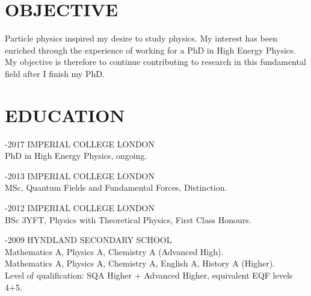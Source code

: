 \documentclass[9pt]{res} %
\begin{document}
 
 
\vspace{0.2cm}
\address{ \\44 Rue de la Combette\\01630 St Genis-Pouilly\\ France\\	matthew.citron09@imperial.ac.uk}
 
                                             
\begin{resume}
                                               
 
\section{OBJECTIVE}
\vspace{0.2cm}
    Particle physics inspired my desire to study physics. My interest has been enriched through the experience of working for a PhD in High Energy Physics. My objective is therefore to continue contributing to research in this fundamental field after I finish my PhD.
   
\section{EDUCATION} 

\vspace{0.2cm}

-2017 IMPERIAL COLLEGE LONDON \\
PhD in High Energy Physics, ongoing.

-2013 IMPERIAL COLLEGE LONDON \\
MSc, Quantum Fields and Fundamental Forces, Distinction.

-2012 IMPERIAL COLLEGE LONDON \\
BSc 3YFT, Physics with Theoretical Physics, First Class Honours.

-2009 HYNDLAND SECONDARY SCHOOL \\
Mathematics A, Physics A, Chemistry A (Advanced High). \\
Mathematics A, Physics A, Chemistry A, English A, History A (Higher).\\
Level of qualification: SQA Higher + Advanced Higher, equivalent EQF levels 4+5. \\
 

\end{resume}
\end{document}

